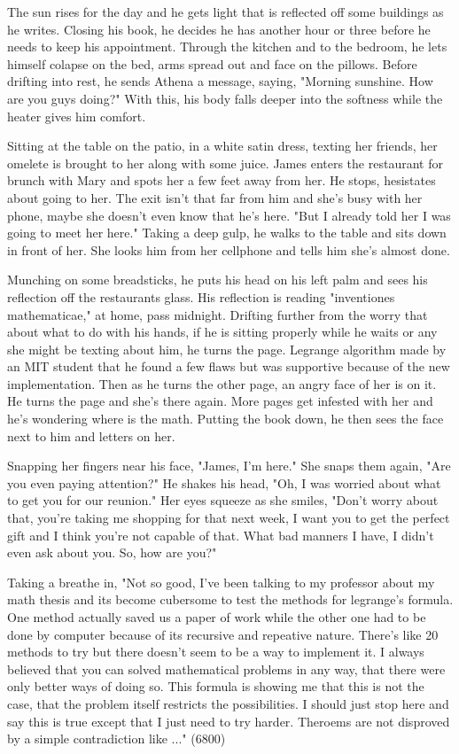         The sun rises for the day and he gets light that is reflected off some buildings as he writes. Closing his book, he decides he has another
    hour or three before he needs to keep his appointment. Through the kitchen and to the bedroom, he lets himself colapse on the bed, arms
    spread out and face on the pillows. Before drifting into rest, he sends Athena a message, saying, "Morning sunshine. How are you guys doing?"
    With this, his body falls deeper into the softness while the heater gives him comfort.


        Sitting at the table on the patio, in a white satin dress, texting her friends, her omelete is brought to her along with some juice. James
    enters the restaurant for brunch with Mary and spots her a few feet away from her. He stops, hesistates about going to her. The exit isn't
    that far from him and she's busy with her phone, maybe she doesn't even know that he's here. "But I already told her I was going to meet her
    here." Taking a deep gulp, he walks to the table and sits down in front of her. She looks him from her cellphone and tells him she's almost 
    done.

        Munching on some breadsticks, he puts his head on his left palm and sees his reflection off the restaurants glass. His reflection is
    reading "inventiones mathematicae," at home, pass midnight. Drifting further from the worry that about what to do with his hands, if he is
    sitting properly while he waits or any she might be texting about him, he turns the page. Legrange algorithm made by an MIT student that he
    found a few flaws but was supportive because of the new implementation. Then as he turns the other page, an angry face of her is on it. He
    turns the page and she's there again. More pages get infested with her and he's wondering where is the math. Putting the book down, he then
    sees the face next to him and letters on her.

        Snapping her fingers near his face, "James, I'm here." She snaps them again, "Are you even paying attention?" He shakes his head, "Oh,
    I was worried about what to get you for our reunion." Her eyes squeeze as she smiles, "Don't worry about that, you're taking me shopping for
    that next week, I want you to get the perfect gift and I think you're not capable of that. What bad manners I have, I didn't even ask about
    you. So, how are you?"

        Taking a breathe in, "Not so good, I've been talking to my professor about my math thesis and its become cubersome to test the methods
    for legrange's formula. One method actually saved us a paper of work while the other one had to be done by computer because of its recursive
    and repeative nature. There's like 20 methods to try but there doesn't seem to be a way to implement it. I always believed that you can solved
    mathematical problems in any way, that there were only better ways of doing so. This formula is showing me that this is not the case, that
    the problem itself restricts the possibilities. I should just stop here and say this is true except that I just need to try harder. Theroems
    are not disproved by a simple contradiction like ..." (6800)

